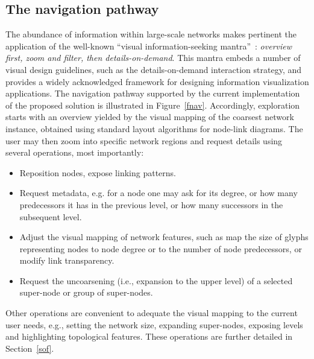 \documentclass[runningheads]{llncs}
\begin{document}
\subsection{The navigation pathway}\label{nav}
The abundance of information within large-scale networks makes pertinent the
application of the well-known ``visual information-seeking mantra''~\cite{shneiderman1996eyes}:
\emph{overview first, zoom and filter, then details-on-demand}.
This mantra embeds a number of visual design guidelines,
such as the details-on-demand interaction strategy, and provides
a widely acknowledged framework for designing information visualization applications. The navigation pathway supported by the current implementation of the proposed solution is illustrated in Figure~\ref{fnav}.
Accordingly, exploration starts with an overview yielded by the visual mapping of the coarsest network instance, obtained using standard layout algorithms for node-link diagrams.
The user may then zoom into specific network regions and request
details using several operations, most importantly:
\begin{itemize}
  \item Reposition nodes, expose linking patterns.
  \item Request metadata, e.g. for a node one may ask for its degree, or how many predecessors it has in the previous level, or how many successors in the subsequent level.
  \item Adjust the visual mapping of network features, such as map the size of glyphs representing nodes to node degree or to the number of node predecessors, or modify link transparency.
  \item Request the uncoarsening (i.e., expansion to the upper level) of a selected super-node or group of super-nodes.
\end{itemize}

\noindent Other operations are convenient to adequate the visual mapping to the current user needs, e.g., setting the network size, expanding super-nodes, exposing levels and highlighting topological features. These operations are further detailed in Section~\ref{sof}.
\end{document}
